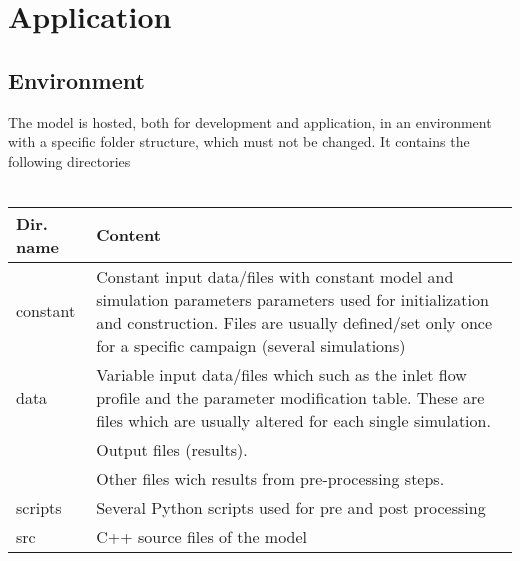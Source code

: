 \chapter{Application}\label{cha:application}



\section{Environment} \label{sec:environment}
The model is hosted, both for development and application, in an environment with a specific folder structure, which must not be changed. It contains the following directories
\\ \\
\begin{tabular}{L{0.25\textwidth} L{0.75\textwidth}}
  \toprule
  Dir. name           & Content \\
  \midrule
  constant       & Constant input data/files with constant model and simulation parameters parameters used for initialization and construction. Files are usually defined/set only once for a specific campaign (several simulations) \\
  \midrule
  data           & Variable input data/files which such as the inlet flow profile and the parameter modification table. These are files which are usually altered for each single simulation. \\
                 & Output files (results).\\
                 & Other files wich results from pre-processing steps. \\
  \midrule
  scripts        & Several Python scripts used for pre and post processing \\
  \midrule
  src            & C++ source files of the model \\
  \bottomrule
\end{tabular}

\clearpage

